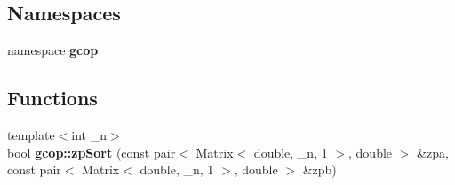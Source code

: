 \subsection*{\-Namespaces}
\begin{DoxyCompactItemize}
\item 
namespace {\bf gcop}
\end{DoxyCompactItemize}
\subsection*{\-Functions}
\begin{DoxyCompactItemize}
\item 
{\footnotesize template$<$int \-\_\-n$>$ }\\bool {\bf gcop\-::zp\-Sort} (const pair$<$ \-Matrix$<$ double, \-\_\-n, 1 $>$, double $>$ \&zpa, const pair$<$ \-Matrix$<$ double, \-\_\-n, 1 $>$, double $>$ \&zpb)
\end{DoxyCompactItemize}
